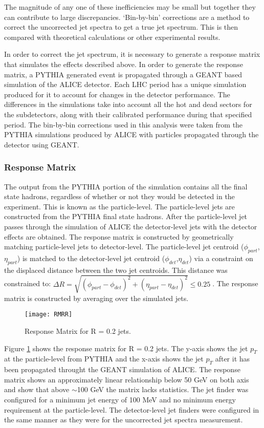\noindent
The magnitude of any one of these inefficiencies may be small but together they can contribute to large discrepancies.  `Bin-by-bin' corrections are a method to correct the uncorrected jet spectra to get a true jet spectrum.  This is then compared with theoretical calculations or other experimental results.

In order to correct the jet spectrum, it is necessary to generate a response matrix that simulates the effects described above.  In order to generate the response matrix, a PYTHIA generated event is propagated through a GEANT based simulation of the ALICE detector.  Each LHC period has a unique simulation produced for it to account for changes in the detector performance.  The differences in the simulations take into account all the hot and dead sectors for the subdetectors, along with their calibrated performance during that specified period.  The bin-by-bin corrections used in this analysis were taken from the PYTHIA simulations produced by ALICE with particles propagated through the detector using GEANT.

\subsubsection{Response Matrix}
The output from the PYTHIA portion of the simulation contains all the final state hadrons, regardless of whether or not they would be detected in the experiment.  This is known as the particle-level.  The particle-level jets are constructed from the PYTHIA final state hadrons.  After the particle-level jet passes through the simulation of ALICE the detector-level jets with the detector effects are obtained.
The response matrix is constructed by geometrically matching particle-level jets to detector-level.  The particle-level jet centroid ($\phi_{part}$,$\eta_{part}$) is matched to the detector-level jet centroid ($\phi_{det}$,$\eta_{det}$) via a constraint on the displaced distance between the two jet centroids.  This distance was constrained to: $\Delta  R = \sqrt{(\phi_{part} - \phi_{det})^{2} + (\eta_{part} - \eta_{det})^{2}} \leq 0.25 \; $.  The response matrix is constructed by averaging over the simulated jets.

\begin{figure}[h]
\texttt{[image: RMRR]}
\centering
\caption{Response Matrix for R = 0.2 jets.}
\label{fig:response}
\end{figure}

Figure \ref{fig:response} shows the response matrix for R = 0.2 jets.  The y-axis shows the jet $p_{T}$ at the particle-level from PYTHIA and the x-axis shows the jet $p_{T}$ after it has been propagated throught the GEANT simulation of ALICE.  The response matrix shows an approximately linear relationship below 50 GeV on both axis and show that above $\sim$100 GeV the matrix lacks statistics.  The jet finder was configured for a minimum jet energy of 100 MeV and no minimum energy requirement at the particle-level.  The detector-level jet finders were configured in the same manner as they were for the uncorrected jet spectra measurement.

